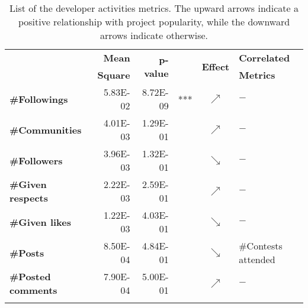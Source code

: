 \begin{table}[t]
\centering
\scriptsize
\setlength{\tabcolsep}{2.5pt}
\caption{List of the developer activities metrics. The upward arrows indicate a positive relationship with project popularity, while the downward arrows indicate otherwise.}
\label{table:RQ5}
	\begin{tabularx}{0.8\columnwidth}{>{\bfseries}lrrlcl}
	\hline
	\multirow{2}{*}{Metric} & \textbf{Mean}  & \multirow{2}{*}{\textbf{p-value}}  &     & \multirow{2}{*}{\textbf{Effect}}     &\textbf{Correlated}\\
	&\textbf{Square}&& &&\textbf{Metrics} \\
	\hline	\hline
\#Followings     & 5.83E-02 & 8.72E-09 & *** & $\nearrow$ &              $-$        \\
\#Communities       & 4.01E-03 & 1.29E-01 &     & $\nearrow$ &             $-$         \\
\#Followers      & 3.96E-03 & 1.32E-01 &     & $\searrow$ &              $-$        \\
\#Given respects      & 2.22E-03 & 2.59E-01 &     & $\nearrow$ &               $-$       \\
\#Given likes           & 1.22E-03 & 4.03E-01 &     & $\searrow$ &              $-$        \\
\#Posts           & 8.50E-04 & 4.84E-01 &     & $\searrow$ & \#Contests attended            \\
\#Posted comments & 7.90E-04 & 5.00E-01 &     & $\nearrow$ &              $-$          \\ \hline
\multicolumn{6}{l}{$p-value$ codes:  `***'$<0$, `**'$<0.001$, `*'$<0.01$, `.'$<0.05$}\\                      
	\end{tabularx}
\end{table}
